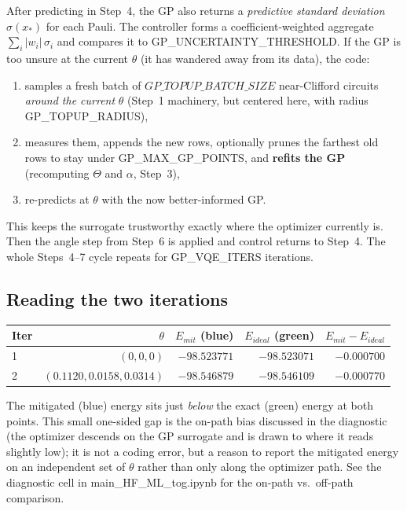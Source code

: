\documentclass[11pt]{article}
\def\bm#1{#1}%
\def\texttt#1{#1}%
\def\mathrm#1{#1}%
\newcommand{\Emit}{E_{\mathrm{mit}}}
\newcommand{\Eideal}{E_{\mathrm{ideal}}}
\begin{document}
After predicting in Step~4, the GP also returns a \emph{predictive standard
deviation} $\sigma(\bm x_*)$ for each Pauli. The controller forms a
coefficient-weighted aggregate $\sum_i |w_i|\,\sigma_i$ and compares it to
\texttt{GP\_UNCERTAINTY\_THRESHOLD}. If the GP is too unsure at the current
$\bm\theta$ (it has wandered away from its data), the code:
\begin{enumerate}
  \item samples a fresh batch of $\texttt{GP\_TOPUP\_BATCH\_SIZE}$ near-Clifford
        circuits \emph{around the current} $\bm\theta$ (Step~1 machinery, but
        centered here, with radius \texttt{GP\_TOPUP\_RADIUS}),
  \item measures them, appends the new rows, optionally prunes the farthest old
        rows to stay under \texttt{GP\_MAX\_GP\_POINTS}, and \textbf{refits the GP}
        (recomputing $\bm\Theta$ and $\bm\alpha$, Step~3),
  \item re-predicts at $\bm\theta$ with the now better-informed GP.
\end{enumerate}
This keeps the surrogate trustworthy exactly where the optimizer currently is.
Then the angle step from Step~6 is applied and control returns to Step~4. The
whole Steps~4--7 cycle repeats for \texttt{GP\_VQE\_ITERS} iterations.

\subsection{Reading the two iterations}

\begin{center}
\renewcommand{\arraystretch}{1.2}
\begin{tabular}{@{}lrrrr@{}}
\toprule
Iter & $\bm\theta$ & $\Emit$ (blue) & $\Eideal$ (green) & $\Emit-\Eideal$ \\
\midrule
1 & $(0,0,0)$ & $-98.523771$ & $-98.523071$ & $-0.000700$ \\
2 & $(0.1120,0.0158,0.0314)$ & $-98.546879$ & $-98.546109$ & $-0.000770$ \\
\bottomrule
\end{tabular}
\end{center}

The mitigated (blue) energy sits just \emph{below} the exact (green) energy at
both points. This small one-sided gap is the on-path bias discussed in the
diagnostic (the optimizer descends on the GP surrogate and is drawn to where it
reads slightly low); it is not a coding error, but a reason to report the
mitigated energy on an independent set of $\bm\theta$ rather than only along the
optimizer path. See the diagnostic cell in \texttt{main\_HF\_ML\_tog.ipynb} for
the on-path vs.\ off-path comparison.
\end{document}

